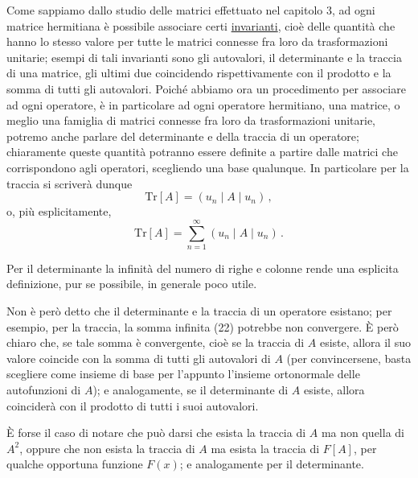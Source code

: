 \documentclass[11pt, a4paper]{book}
\numberwithin{equation}{section}
\begin{document}
Come sappiamo dallo studio delle matrici effettuato nel capitolo 3, ad ogni matrice hermitiana è possibile associare certi \uline{invarianti}, cioè delle quantità che hanno lo stesso valore per tutte le matrici connesse fra loro da trasformazioni unitarie; esempi di tali invarianti sono gli autovalori, il determinante e la traccia di una matrice, gli ultimi due coincidendo rispettivamente con il prodotto e la somma di tutti gli autovalori. Poiché abbiamo ora un procedimento per associare ad ogni operatore, è in particolare ad ogni operatore hermitiano, una matrice, o meglio una famiglia di matrici connesse fra loro da trasformazioni unitarie, potremo anche parlare del determinante e della traccia di un operatore; chiaramente queste quantità potranno essere definite a partire dalle matrici che corrispondono agli operatori, scegliendo una base qualunque. In particolare per la traccia si scriverà dunque
\begin{equation}
\mathrm{Tr}[A]=(u_n\mid A\mid u_n)\,, \tag{22a}
\end{equation}
o, più esplicitamente,
\begin{equation}
\mathrm{Tr}[A]=\sum_{n=1}^{\infty}(u_n\mid A\mid u_n)\,. \tag{22b}
\end{equation}

Per il determinante la infinità del numero di righe e colonne rende una esplicita definizione, pur se possibile, in generale poco utile.

Non è però detto che il determinante e la traccia di un operatore esistano; per esempio, per la traccia, la somma infinita (22) potrebbe non convergere. È però chiaro che, se tale somma è convergente, cioè se la traccia di $A$ esiste, allora il suo valore coincide con la somma di tutti gli autovalori di $A$ (per convincersene, basta scegliere come insieme di base per l'appunto l'insieme ortonormale delle autofunzioni di $A$); e analogamente, se il determinante di $A$ esiste, allora coinciderà con il prodotto di tutti i suoi autovalori.

È forse il caso di notare che può darsi che esista la traccia di $A$ ma non quella di $A^2$, oppure che non esista la traccia di $A$ ma esista la traccia di $F[A]$, per qualche opportuna funzione $F(x)$; e analogamente per il determinante.
\end{document}
